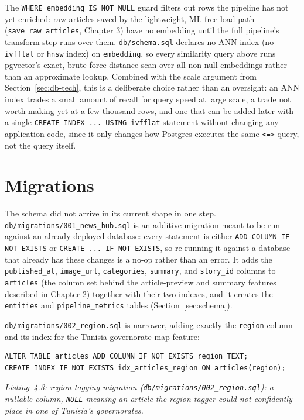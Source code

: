 The \texttt{WHERE embedding IS NOT NULL} guard filters out rows the pipeline has not yet enriched: raw articles saved by the lightweight, ML-free load path (\texttt{save\_raw\_articles}, Chapter 3) have no embedding until the full pipeline's transform step runs over them. \texttt{db/\allowbreak schema.sql} declares no ANN index (no \texttt{ivfflat} or \texttt{hnsw} index) on \texttt{embedding}, so every similarity query above runs pgvector's exact, brute-force distance scan over all non-null embeddings rather than an approximate lookup. Combined with the scale argument from Section~\ref{sec:db-tech}, this is a deliberate choice rather than an oversight: an ANN index trades a small amount of recall for query speed at large scale, a trade not worth making yet at a few thousand rows, and one that can be added later with a single \texttt{CREATE INDEX ... USING ivfflat} statement without changing any application code, since it only changes how Postgres executes the same \texttt{<=>} query, not the query itself.

\section{Migrations}
\label{sec:migrations}
The schema did not arrive in its current shape in one step. \texttt{db/migrations/001\_news\_hub.sql} is an additive migration meant to be run against an already-deployed database: every statement is either \texttt{ADD COLUMN IF NOT EXISTS} or \texttt{CREATE ... IF NOT EXISTS}, so re-running it against a database that already has these changes is a no-op rather than an error. It adds the \texttt{published\_at}, \texttt{image\_url}, \texttt{categories}, \texttt{summary}, and \texttt{story\_id} columns to \texttt{articles} (the column set behind the article-preview and summary features described in Chapter 2) together with their two indexes, and it creates the \texttt{entities} and \texttt{pipeline\_metrics} tables (Section~\ref{sec:schema}).

\texttt{db/migrations/002\_region.sql} is narrower, adding exactly the \texttt{region} column and its index for the Tunisia governorate map feature:

\begin{verbatim}
ALTER TABLE articles ADD COLUMN IF NOT EXISTS region TEXT;
CREATE INDEX IF NOT EXISTS idx_articles_region ON articles(region);
\end{verbatim}
\begin{center}
\textit{Listing~4.3: region-tagging migration (\texttt{db/migrations/002\_region.sql}): a nullable column, \texttt{NULL} meaning an article the region tagger could not confidently place in one of Tunisia's governorates.}
\end{center}


